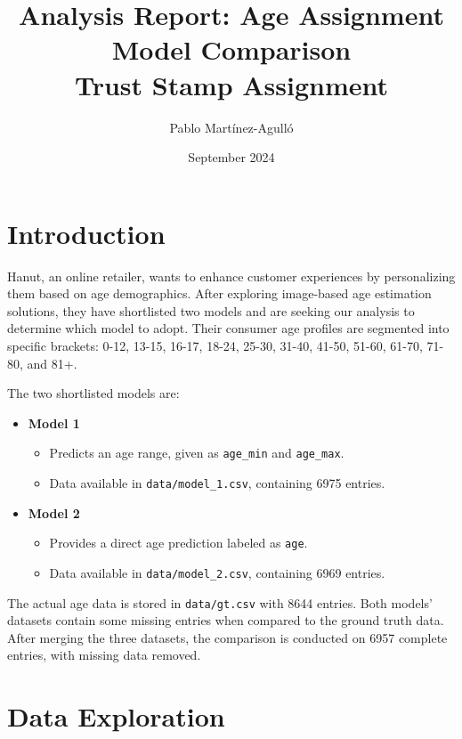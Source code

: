 \documentclass{article}
\title{Analysis Report: Age Assignment Model Comparison \\ Trust Stamp Assignment}
\author{Pablo Martínez-Agulló}
\date{September 2024}
\begin{document}
\maketitle

\section{Introduction}
Hanut, an online retailer, wants to enhance customer experiences by personalizing them based on age demographics. After exploring image-based age estimation solutions, they have shortlisted two models and are seeking our analysis to determine which model to adopt. Their consumer age profiles are segmented into specific brackets: 0-12, 13-15, 16-17, 18-24, 25-30, 31-40, 41-50, 51-60, 61-70, 71-80, and 81+.

The two shortlisted models are:
\begin{itemize}
    \item \textbf{Model 1}
    \begin{itemize}
        \item Predicts an age range, given as \texttt{age\_min} and \texttt{age\_max}.
        \item Data available in \texttt{data/model\_1.csv}, containing 6975 entries.
    \end{itemize}
    
    \item \textbf{Model 2}
    \begin{itemize}
        \item Provides a direct age prediction labeled as \texttt{age}.
        \item Data available in \texttt{data/model\_2.csv}, containing 6969 entries.
    \end{itemize}
\end{itemize}

The actual age data is stored in \texttt{data/gt.csv} with 8644 entries. Both models' datasets contain some missing entries when compared to the ground truth data. After merging the three datasets, the comparison is conducted on 6957 complete entries, with missing data removed.

\section{Data Exploration}

\end{document}
